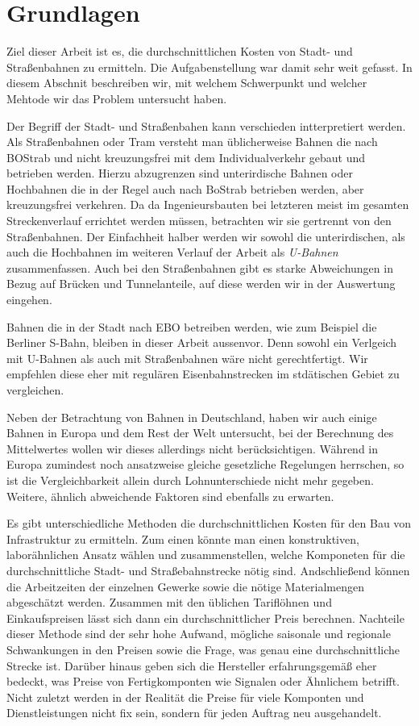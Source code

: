 \chapter{Grundlagen}

Ziel dieser Arbeit ist es, die durchschnittlichen Kosten von Stadt- und
Straßenbahnen zu ermitteln. Die Aufgabenstellung war damit sehr weit gefasst. In
diesem Abschnit beschreiben wir, mit welchem Schwerpunkt und welcher Mehtode wir
das Problem untersucht haben.

Der Begriff der Stadt- und Straßenbahen kann verschieden intterpretiert
werden. Als Straßenbahnen oder Tram versteht man üblicherweise Bahnen die nach
BOStrab \cite{bostrab} und nicht kreuzungsfrei mit dem Individualverkehr gebaut
und betrieben werden. Hierzu abzugrenzen sind unterirdische Bahnen oder
Hochbahnen die in der Regel auch nach BoStrab betrieben werden, aber
kreuzungsfrei verkehren. Da da Ingenieursbauten bei letzteren meist im gesamten
Streckenverlauf errichtet werden müssen, betrachten wir sie gertrennt von den
Straßenbahnen. Der Einfachheit halber werden wir sowohl die unterirdischen, als
auch die Hochbahnen im weiteren Verlauf der Arbeit als \emph{U-Bahnen}
zusammenfassen. Auch bei den Straßenbahnen gibt es starke Abweichungen in Bezug
auf Brücken und Tunnelanteile, auf diese werden wir in der Auswertung eingehen.

Bahnen die in der Stadt nach EBO \cite{ebo} betreiben werden, wie zum Beispiel
die Berliner S-Bahn, bleiben in dieser Arbeit aussenvor. Denn sowohl ein
Verlgeich mit U-Bahnen als auch mit Straßenbahnen wäre nicht gerechtfertigt. Wir
empfehlen diese eher mit regulären Eisenbahnstrecken im stdätischen Gebiet zu
vergleichen.

Neben der Betrachtung von Bahnen in Deutschland, haben wir auch einige Bahnen in
Europa und dem Rest der Welt untersucht, bei der Berechnung des Mittelwertes
wollen wir dieses allerdings nicht berücksichtigen. Während in Europa zumindest noch
ansatzweise gleiche gesetzliche Regelungen herrschen, so ist die
Vergleichbarkeit allein durch Lohnunterschiede nicht mehr gegeben. Weitere,
ähnlich abweichende Faktoren sind ebenfalls zu erwarten.

Es gibt unterschiedliche Methoden die durchschnittlichen Kosten für den Bau von
Infrastruktur zu ermitteln. Zum einen könnte man einen konstruktiven,
laborähnlichen Ansatz wählen und zusammenstellen, welche Komponeten für die
durchschnittliche Stadt- und Straßebahnstrecke nötig sind. Andschließend können
die Arbeitzeiten der einzelnen Gewerke sowie die nötige Materialmengen
abgeschätzt werden. Zusammen mit den üblichen Tariflöhnen und Einkaufspreisen
lässt sich dann ein durchschnittlicher Preis berechnen. Nachteile dieser Methode
sind der sehr hohe Aufwand, mögliche saisonale und regionale Schwankungen in den
Preisen sowie die Frage, was genau eine durchschnittliche Strecke ist. Darüber
hinaus geben sich die Hersteller erfahrungsgemäß eher bedeckt, was Preise von
Fertigkomponten wie Signalen oder Ähnlichem betrifft. Nicht zuletzt werden in
der Realität die Preise für viele Komponten und Dienstleistungen nicht fix sein,
sondern für jeden Auftrag neu ausgehandelt.

